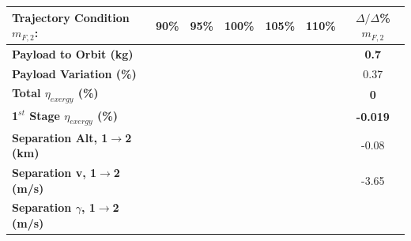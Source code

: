 \begin{table}
\begin{tabular}{l c c c c c c} 
	\hline \textbf{Trajectory Condition}   \qquad  $m_{F,2}$:
	&90\%
	&95\%
	&100\%
	&105\%
	&110\%
	& $\Delta/\Delta$\%$m_{F,2}$
	\\
	\hline \textbf{Payload to Orbit (kg)}
	& \textbf{\PayloadToOrbitmFuelNinetyNoReturn}
	& \textbf{\PayloadToOrbitmFuelNinetyFiveNoReturn}
	& \textbf{\PayloadToOrbitmFuelStandardNoReturn}
	& \textbf{\PayloadToOrbitmFuelOneHundredFiveNoReturn}
	& \textbf{\PayloadToOrbitmFuelOneHundredTenNoReturn}
	&\textbf{0.7}
	\\
	\textbf{Payload Variation (\%)}
	& \PayloadVarmFuelNinetyNoReturn
	& \PayloadVarmFuelNinetyFiveNoReturn
	& \PayloadVarmFuelStandardNoReturn
	& \PayloadVarmFuelOneHundredFiveNoReturn
	& \PayloadVarmFuelOneHundredTenNoReturn
	&0.37
	\\
	\textbf{Total $\eta_{exergy}$ (\%)}
	& \textbf{\totalExergyEffmFuelNinetyNoReturn}
	& \textbf{\totalExergyEffmFuelNinetyFiveNoReturn}
	& \textbf{\totalExergyEffmFuelStandardNoReturn}
	& \textbf{\totalExergyEffmFuelOneHundredFiveNoReturn}
	& \textbf{\totalExergyEffmFuelOneHundredTenNoReturn}
	& \textbf{0}
	\\
	\hline 
	\textbf{1$^{st}$ Stage $\eta_{exergy}$ (\%)}
	& \textbf{\firstExergyEffmFuelNinetyNoReturn}
	& \textbf{\firstExergyEffmFuelNinetyFiveNoReturn}
	& \textbf{\firstExergyEffmFuelStandardNoReturn}
	& \textbf{\firstExergyEffmFuelOneHundredFiveNoReturn}
	& \textbf{\firstExergyEffmFuelOneHundredTenNoReturn}
	& \textbf{-0.019}
	\\
	\textbf{Separation Alt, 1$\rightarrow$2 (km)}
	& \firstsecondSeparationAltmFuelNinetyNoReturn
	& \firstsecondSeparationAltmFuelNinetyFiveNoReturn
	& \firstsecondSeparationAltmFuelStandardNoReturn
	& \firstsecondSeparationAltmFuelOneHundredFiveNoReturn
	& \firstsecondSeparationAltmFuelOneHundredTenNoReturn
	&-0.08
	\\
	\textbf{Separation v, 1$\rightarrow$2 (m/s)}
	& \firstsecondSeparationvmFuelNinetyNoReturn
	& \firstsecondSeparationvmFuelNinetyFiveNoReturn
	& \firstsecondSeparationvmFuelStandardNoReturn
	& \firstsecondSeparationvmFuelOneHundredFiveNoReturn
	& \firstsecondSeparationvmFuelOneHundredTenNoReturn
	&-3.65
	\\
	\textbf{Separation $\gamma$, 1$\rightarrow$2 (m/s)}
	& \firstsecondSeparationgammamFuelNinetyNoReturn
	& \firstsecondSeparationgammamFuelNinetyFiveNoReturn
	& \firstsecondSeparationgammamFuelStandardNoReturn
	& \firstsecondSeparationgammamFuelOneHundredFiveNoReturn

\end{tabular}
\end{table}
